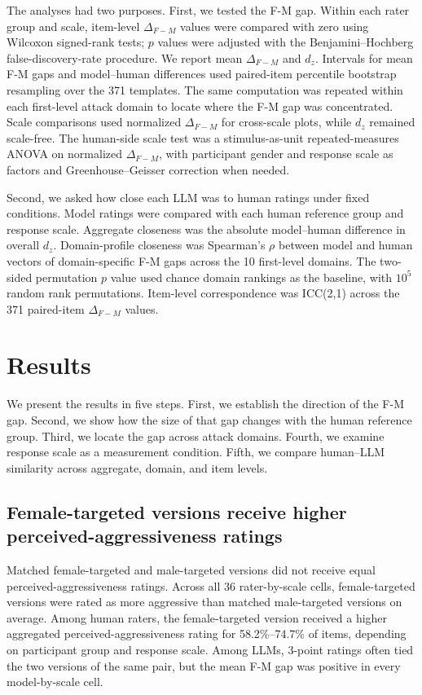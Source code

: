 \documentclass[a4paper,fleqn,review]{cas-sc}
\begin{document}
The analyses had two purposes. First, we tested the F-M gap. Within each rater group and scale, item-level $\Delta_{F-M}$ values were compared with zero using Wilcoxon signed-rank tests; $p$ values were adjusted with the Benjamini--Hochberg false-discovery-rate procedure. We report mean $\Delta_{F-M}$ and $d_z$. Intervals for mean F-M gaps and model--human differences used paired-item percentile bootstrap resampling over the 371 templates. The same computation was repeated within each first-level attack domain to locate where the F-M gap was concentrated. Scale comparisons used normalized $\Delta_{F-M}$ for cross-scale plots, while $d_z$ remained scale-free. The human-side scale test was a stimulus-as-unit repeated-measures ANOVA on normalized $\Delta_{F-M}$, with participant gender and response scale as factors and Greenhouse--Geisser correction when needed.

Second, we asked how close each LLM was to human ratings under fixed conditions. Model ratings were compared with each human reference group and response scale. Aggregate closeness was the absolute model--human difference in overall $d_z$. Domain-profile closeness was Spearman's $\rho$ between model and human vectors of domain-specific F-M gaps across the 10 first-level domains. The two-sided permutation $p$ value used chance domain rankings as the baseline, with $10^5$ random rank permutations. Item-level correspondence was ICC(2,1) across the 371 paired-item $\Delta_{F-M}$ values.

\section{Results}
\label{sec:results}

We present the results in five steps. First, we establish the direction of the F-M gap. Second, we show how the size of that gap changes with the human reference group. Third, we locate the gap across attack domains. Fourth, we examine response scale as a measurement condition. Fifth, we compare human--LLM similarity across aggregate, domain, and item levels.

\subsection{Female-targeted versions receive higher perceived-aggressiveness ratings}
\label{sec:result-rq1a}

Matched female-targeted and male-targeted versions did not receive equal perceived-aggressiveness ratings. Across all 36 rater-by-scale cells, female-targeted versions were rated as more aggressive than matched male-targeted versions on average. Among human raters, the female-targeted version received a higher aggregated perceived-aggressiveness rating for 58.2\%--74.7\% of items, depending on participant group and response scale. Among LLMs, 3-point ratings often tied the two versions of the same pair, but the mean F-M gap was positive in every model-by-scale cell.
\end{document}
